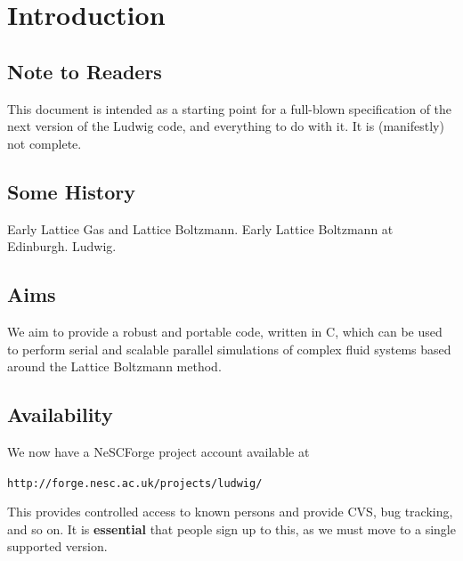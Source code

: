 %
%
%
%
%
%


\section{Introduction}

\subsection{Note to Readers}

This document is intended as a starting point for a full-blown
specification of the next version of the Ludwig code, and everything
to do with it. It is (manifestly) not complete.


\subsection{Some History}

Early Lattice Gas and Lattice Boltzmann. Early Lattice Boltzmann at Edinburgh.
Ludwig.

\subsection{Aims}

We aim to provide a robust and portable code, written in C, which
can be used to perform serial and scalable parallel simulations of
complex fluid systems based around the Lattice Boltzmann method.

\subsection{Availability}

We now have a NeSCForge project account available at

\texttt{http://forge.nesc.ac.uk/projects/ludwig/}

This provides controlled access to known
persons and provide CVS, bug tracking, and so on. It is
\textbf{essential} that people sign up to this, as we must
move to a single supported version.

